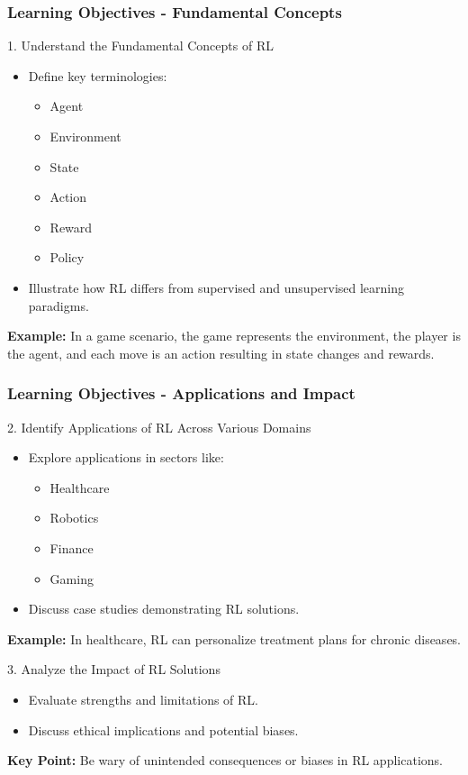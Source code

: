 \documentclass{beamer}
\begin{document}
\begin{frame}[fragile]
    \frametitle{Learning Objectives - Fundamental Concepts}
    \begin{block}{1. Understand the Fundamental Concepts of RL}
        \begin{itemize}
            \item Define key terminologies:
                \begin{itemize}
                    \item Agent
                    \item Environment
                    \item State
                    \item Action
                    \item Reward
                    \item Policy
                \end{itemize}
            \item Illustrate how RL differs from supervised and unsupervised learning paradigms.
        \end{itemize}
    \end{block}
    \textbf{Example:} In a game scenario, the game represents the environment, the player is the agent, and each move is an action resulting in state changes and rewards.
\end{frame}

\begin{frame}[fragile]
    \frametitle{Learning Objectives - Applications and Impact}
    \begin{block}{2. Identify Applications of RL Across Various Domains}
        \begin{itemize}
            \item Explore applications in sectors like:
                \begin{itemize}
                    \item Healthcare
                    \item Robotics
                    \item Finance
                    \item Gaming
                \end{itemize}
            \item Discuss case studies demonstrating RL solutions.
        \end{itemize}
        \textbf{Example:} In healthcare, RL can personalize treatment plans for chronic diseases.
    \end{block}
    
    \begin{block}{3. Analyze the Impact of RL Solutions}
        \begin{itemize}
            \item Evaluate strengths and limitations of RL.
            \item Discuss ethical implications and potential biases.
        \end{itemize}
        \textbf{Key Point:} Be wary of unintended consequences or biases in RL applications.
    \end{block}
\end{frame}
\end{document}
